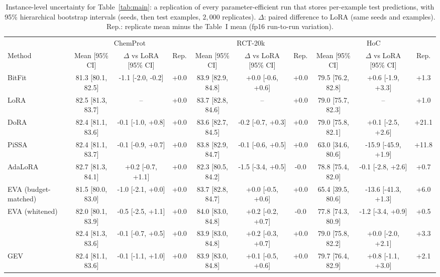 \begin{table}[!ht]
\centering
\caption{Instance-level uncertainty for Table~\ref{tab:main}: a replication of every parameter-efficient run that stores per-example test predictions, with 95\% hierarchical bootstrap intervals (seeds, then test examples, $2{,}000$ replicates). $\Delta$: paired difference to LoRA (same seeds and examples). Rep.: replicate mean minus the Table~I mean (fp16 run-to-run variation).}
\label{tab:ci}
\scriptsize
\setlength{\tabcolsep}{2.5pt}
\begin{tabular}{lccccccccc}
\toprule
 & \multicolumn{3}{c}{ChemProt} & \multicolumn{3}{c}{RCT-20k} & \multicolumn{3}{c}{HoC} \\
Method & Mean [95\% CI] & $\Delta$ vs LoRA [95\% CI] & Rep. & Mean [95\% CI] & $\Delta$ vs LoRA [95\% CI] & Rep. & Mean [95\% CI] & $\Delta$ vs LoRA [95\% CI] & Rep. \\
\midrule
BitFit & 81.3 [80.1, 82.5] & -1.1 [-2.0, -0.2] & +0.0 & 83.9 [82.9, 84.8] & +0.0 [-0.6, +0.6] & +0.0 & 79.5 [76.2, 82.8] & +0.6 [-1.9, +3.3] & +1.3 \\
LoRA & 82.5 [81.3, 83.7] & -- & +0.0 & 83.7 [82.8, 84.6] & -- & +0.0 & 79.0 [75.7, 82.3] & -- & +1.0 \\
DoRA & 82.4 [81.1, 83.6] & -0.1 [-1.0, +0.8] & +0.0 & 83.6 [82.7, 84.5] & -0.2 [-0.7, +0.3] & +0.0 & 79.0 [75.8, 82.1] & +0.1 [-2.5, +2.6] & +21.1 \\
PiSSA & 82.4 [81.1, 83.7] & -0.1 [-0.9, +0.7] & +0.0 & 83.8 [82.9, 84.7] & -0.1 [-0.6, +0.5] & +0.0 & 63.0 [34.6, 80.6] & -15.9 [-45.9, +1.9] & +11.8 \\
AdaLoRA & 82.7 [81.3, 84.1] & +0.2 [-0.7, +1.1] & +0.0 & 82.3 [80.5, 84.2] & -1.5 [-3.4, +0.5] & -0.0 & 78.8 [75.4, 82.0] & -0.1 [-2.8, +2.6] & +0.7 \\
EVA (budget-matched) & 81.5 [80.0, 83.0] & -1.0 [-2.1, +0.0] & +0.0 & 83.7 [82.8, 84.7] & +0.0 [-0.5, +0.6] & +0.0 & 65.4 [39.5, 80.6] & -13.6 [-41.3, +1.3] & +6.0 \\
EVA (whitened) & 82.0 [80.1, 83.9] & -0.5 [-2.5, +1.1] & +0.0 & 84.0 [83.0, 84.8] & +0.2 [-0.2, +0.7] & -0.0 & 77.8 [74.3, 80.9] & -1.2 [-3.4, +0.9] & +0.5 \\
\method{} & 82.4 [81.3, 83.6] & -0.1 [-0.7, +0.5] & +0.0 & 83.9 [83.0, 84.8] & +0.2 [-0.3, +0.7] & +0.0 & 79.0 [75.8, 82.2] & +0.0 [-2.0, +2.1] & +3.3 \\
GEV & 82.4 [81.1, 83.6] & -0.1 [-1.1, +1.0] & +0.0 & 83.9 [83.0, 84.8] & +0.1 [-0.5, +0.6] & +0.0 & 79.7 [76.4, 82.9] & +0.8 [-1.1, +3.0] & +2.1 \\
\bottomrule
\end{tabular}
\end{table}
